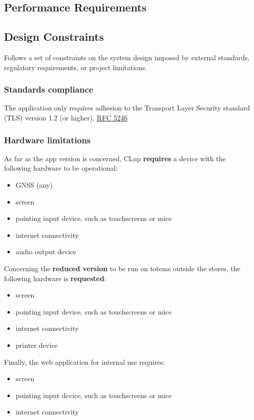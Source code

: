 \subsection{Performance Requirements}

\subsection{Design Constraints}
Follows a set of constraints on the system design imposed by external standards, regulatory requirements, or project
limitations.

\subsubsection{Standards compliance}
The application only requires adhesion to the Transport Layer Security standard (TLS) version 1.2 (or higher), \href{https://tools.ietf.org/html/rfc5246}{RFC 5246}
\subsubsection{Hardware limitations}
As far as the app version is concerned, CLup \textbf{requires} a device with the following hardware to be operational:\newline
\begin{itemize}
    \item GNSS (any)
    \item screen
    \item pointing input device, such as touchscreens or mice
    \item internet connectivity
    \item audio output device
\end{itemize}

\bigskip \noindent Concerning the \textbf{reduced version} to be run on totems outside the stores, the following hardware is \textbf{requested}:\newline
\begin{itemize}
    \item screen
    \item pointing input device, such as touchscreens or mice
    \item internet connectivity
    \item printer device
\end{itemize}

\bigskip \noindent Finally, the web application for internal use requires: \newline
\begin{itemize}
    \item screen
    \item pointing input device, such as touchscreens or mice
    \item internet connectivity
\end{itemize}


